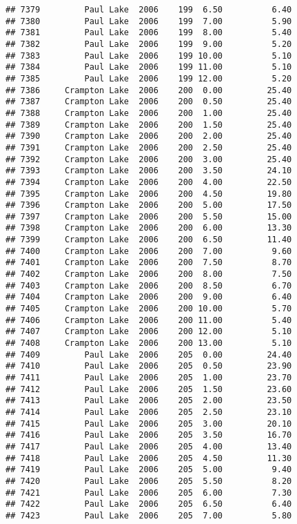 \documentclass[
]{article}
\begin{document}
\begin{verbatim}
## 7379         Paul Lake  2006    199  6.50          6.40
## 7380         Paul Lake  2006    199  7.00          5.90
## 7381         Paul Lake  2006    199  8.00          5.40
## 7382         Paul Lake  2006    199  9.00          5.20
## 7383         Paul Lake  2006    199 10.00          5.10
## 7384         Paul Lake  2006    199 11.00          5.10
## 7385         Paul Lake  2006    199 12.00          5.20
## 7386     Crampton Lake  2006    200  0.00         25.40
## 7387     Crampton Lake  2006    200  0.50         25.40
## 7388     Crampton Lake  2006    200  1.00         25.40
## 7389     Crampton Lake  2006    200  1.50         25.40
## 7390     Crampton Lake  2006    200  2.00         25.40
## 7391     Crampton Lake  2006    200  2.50         25.40
## 7392     Crampton Lake  2006    200  3.00         25.40
## 7393     Crampton Lake  2006    200  3.50         24.10
## 7394     Crampton Lake  2006    200  4.00         22.50
## 7395     Crampton Lake  2006    200  4.50         19.80
## 7396     Crampton Lake  2006    200  5.00         17.50
## 7397     Crampton Lake  2006    200  5.50         15.00
## 7398     Crampton Lake  2006    200  6.00         13.30
## 7399     Crampton Lake  2006    200  6.50         11.40
## 7400     Crampton Lake  2006    200  7.00          9.60
## 7401     Crampton Lake  2006    200  7.50          8.70
## 7402     Crampton Lake  2006    200  8.00          7.50
## 7403     Crampton Lake  2006    200  8.50          6.70
## 7404     Crampton Lake  2006    200  9.00          6.40
## 7405     Crampton Lake  2006    200 10.00          5.70
## 7406     Crampton Lake  2006    200 11.00          5.40
## 7407     Crampton Lake  2006    200 12.00          5.10
## 7408     Crampton Lake  2006    200 13.00          5.10
## 7409         Paul Lake  2006    205  0.00         24.40
## 7410         Paul Lake  2006    205  0.50         23.90
## 7411         Paul Lake  2006    205  1.00         23.70
## 7412         Paul Lake  2006    205  1.50         23.60
## 7413         Paul Lake  2006    205  2.00         23.50
## 7414         Paul Lake  2006    205  2.50         23.10
## 7415         Paul Lake  2006    205  3.00         20.10
## 7416         Paul Lake  2006    205  3.50         16.70
## 7417         Paul Lake  2006    205  4.00         13.40
## 7418         Paul Lake  2006    205  4.50         11.30
## 7419         Paul Lake  2006    205  5.00          9.40
## 7420         Paul Lake  2006    205  5.50          8.20
## 7421         Paul Lake  2006    205  6.00          7.30
## 7422         Paul Lake  2006    205  6.50          6.40
## 7423         Paul Lake  2006    205  7.00          5.80

\end{verbatim}
\end{document}

